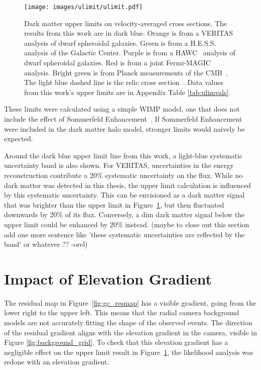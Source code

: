   \begin{figure}[ht]
    \centering
    \texttt{[image: images/ulimit/ulimit.pdf]}
    \caption[Dark Matter Upper Limit Plot]{
      Dark matter upper limits on velocity-averaged cross sections.
      The results from this work are in dark blue.
      Orange is from a VERITAS~\cite{veritas_dm_limit} analysis of dwarf spheroidal galaxies.
      Green is from a H.E.S.S.~\cite{hess_dm_limit} analysis of the Galactic Center.
      Purple is from a HAWC~\cite{hawc_dm_limit} analysis of dwarf spheroidal galaxies.
      Red is from a joint Fermi-MAGIC~\cite{fermagicul} analysis.
      Bright green is from Planck measurements of the CMB~\cite{planck_dm_limit}.
      The light blue dashed line is the relic cross section~\cite{updatedWIMPRelicCrossSection}.
      Data values from this work's upper limits are in Appendix Table \ref{tab:ulimvals}.
    }
    \label{fig:ulim}
  \end{figure}
  
  These limits were calculated using a simple WIMP model, one that does not include the effect of Sommerfeld Enhancement~\cite{sommerfeld}.
  If Sommerfeld Enhancement were included in the dark matter halo model, stronger limits would naively be expected.
  
  Around the dark blue upper limit line from this work, a light-blue systematic uncertainty band is also shown.
  For VERITAS, uncertainties in the energy reconstruction contribute a \nicetilde{}20\% systematic uncertainty on the flux.
  While no dark matter was detected in this thesis, the upper limit calculation is influenced by this systematic uncertainty.
  This can be envisioned as a dark matter signal that was brighter than the upper limit in Figure~\ref{fig:ulim}, but then fluctuated downwards by 20\% of its flux.
  Conversely, a dim dark matter signal below the upper limit could be enhanced by 20\% instead.
  {\color{red}(maybe to close out this section add one more sentence like 'these systematic uncertainties are reflected by the band' or whatever ?? -orel)}
  
  \FloatBarrier

\section{Impact of Elevation Gradient}\label{sec:elevgradient}

  The residual map in Figure~\ref{fig:gc_resmap} has a visible gradient, going from the lower right to the upper left.
  This means that the radial camera background models are not accurately fitting the shape of the observed events.
  The direction of the residual gradient aligns with the elevation gradient in the camera, visible in Figure \ref{fig:background_grid}.
  To check that this elevation gradient has a negligible effect on the upper limit result in Figure~\ref{fig:ulim}, the likelihood analysis was redone with an elevation gradient.
  
